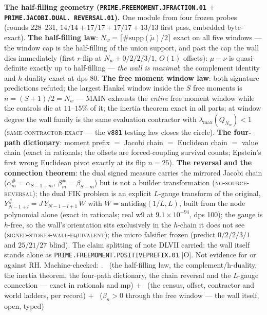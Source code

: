 \par\smallskip\noindent\textbf{The half-filling geometry
(\texttt{PRIME.\allowbreak FREEMOMENT.\allowbreak JFRACTION.01}
$+$ \texttt{PRIME.\allowbreak JACOBI.\allowbreak DUAL.\allowbreak
REVERSAL.01}).}
One module from four frozen probes (rounds 228--231, $14/14 +
17/17 + 17/17 + 13/13$ first pass, embedded byte-exact).
\textbf{The half-filling law}: $N_w = \lceil
\#\mathrm{supp}(\tilde\mu)/2 \rceil$ exact on all five windows
--- the window cap is the half-filling of the union support, and
past the cap the wall dies immediately (first $r$-flip at $N_w +
0/2/2/3/1$, $O(1)$ offsets): $\mu - \nu$ is quasi-definite
exactly up to half-filling --- \emph{the wall is maximal}; the
complement identity and $h$-duality exact at dps 80.  \textbf{The
free moment window law}: both signature predictions refuted; the
largest Hankel window inside the $S$ free moments is $n = (S+1)/2
= N_w$ --- MAIN exhausts the \emph{entire} free moment window
while the controls die at $11$--$15\%$ of it; the inertia theorem
exact in all parts; at window degree the wall family is the same
evaluation contractor with $\lambda_{\max}(Q_{N_w}) < 1$
(\textsc{same-contractor-exact} --- the \texttt{v881} testing law
closes the circle).  \textbf{The four-path dictionary}: moment
prefix $=$ Jacobi chain $=$ Euclidean chain $=$ value chain
(exact in rationals; the offsets are forced-coupling survival
counts; Epstein's first wrong Euclidean pivot exactly at its flip
$n = 25$).  \textbf{The reversal and the connection theorem}: the
dual signed measure carries the mirrored Jacobi chain
($\alpha^{\#}_m = \alpha_{S-1-m}$, $\beta^{\#}_m = \beta_{S-m}$)
but is not a builder transformation
(\textsc{no-source-reversal}); the dual FIK problem is an
explicit $L$-gauge transform of the original, $Y^{\#}_{N-1+l} =
J\,Y_{N-1-l+1}\,W$ with $W = \mathrm{antidiag}(1/L, L)$, built
from the node polynomial alone (exact in rationals; real w9 at
$9.1\times10^{-94}$, dps 100); the gauge is $h$-free, so the
wall's orientation sits exclusively in the $h$-chain it does not
see (\textsc{signed-stokes-wall-equivalent}); the micro falsifier
frozen (predict $0/2/2/3/1$ and $25/21/27$ blind).  The claim
splitting of note DLVII carried: the wall itself stands alone as
\texttt{PRIME.FREEMOMENT.POSITIVEPREFIX.01} [O].  Not evidence
for or against RH.
Machine-checked: .
\mE\ (the half-filling law, the complement/h-duality, the inertia
theorem, the four-path dictionary, the chain reversal and the
$L$-gauge connection --- exact in rationals and mp) $+$ \mC\ (the
census, offset, contractor and world ladders, per record) $+$
\mO\ ($\beta_n > 0$ through the free window --- the wall itself,
open, typed)
\par\smallskip


